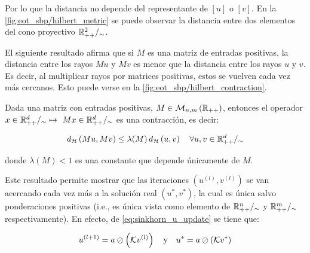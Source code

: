 Por lo que la distancia no depende del representante de $[u]$ o $[v]$. En la \autoref{fig:eot_sbp/hilbert_metric} se puede observar la distancia entre dos elementos del cono proyectivo $\mathbb{R}^{2}_{++}/_\sim$.


El siguiente resultado afirma que si $M$ es una matriz de entradas positivas, la distancia entre los rayos $Mu$ y $Mv$ es menor que la distancia entre los rayos $u$ y $v$. Es decir, al multiplicar rayos por matrices positivas, estos se vuelven cada vez más cercanos. Esto puede verse en la \autoref{fig:eot_sbp/hilbert_contraction}.

\begin{teo}
	Dada una matriz con entradas positivas, $M\in\mathcal{M}_{n,m}\left(\mathbb{R}_{++}\right)$, entonces el operador $x\in\cone{d} \mapsto \ Mx\in\cone{d}$ es una contracción, es decir:

	\begin{equation*}
		d_{\mathcal{H}}\left(Mu,Mv\right) \leq \lambda(M)\, d_{\mathcal{H}}\left(u,v\right)
		\quad \forall u,v\in\mathbb{R}^{d}_{++}/_\sim
	\end{equation*}

	donde $\lambda(M)<1$ es una constante que depende únicamente de $M$.

\end{teo}


Este resultado permite mostrar que las iteraciones $(u^{(l)},v^{(l)})$ se van acercando cada vez más a la solución real $(u^*,v^*)$, la cual es única salvo ponderaciones positivas (i.e., es única vista como elemento de $\mathbb{R}^{n}_{++}/_\sim$ y $\mathbb{R}^{m}_{++}/_\sim$ respectivamente). En efecto, de \eqref{eq:sinkhorn_u_update} se tiene que:

\begin{equation*}
	u^{(l+1)} = a \oslash \left(\mathcal{K} v^{(l)}\right)
	\quad\text{y}\quad
	u^* = a \oslash \left(\mathcal{K} v^*\right)
\end{equation*}

